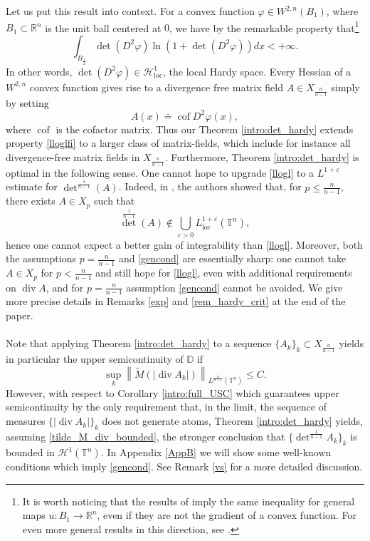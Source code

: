 \documentclass[10pt,reqno]{amsart}
\numberwithin{equation}{section}
\newcommand{\R}{\mathbb{R}}
\newcommand{\T}{\mathbb{T}}
\newcommand{\D}{\mathbb{D}}
\newcommand{\eps}{\varepsilon}
\DeclareMathOperator{\cof}{cof}
\DeclareMathOperator{\dv}{div}
\DeclareMathOperator{\loc}{loc}
\theoremstyle{plain}
\theoremstyle{definition}
\theoremstyle{remark}
\begin{document}
Let us put this result into context. For a convex function $\varphi\in W^{2,n}(B_1)$, where $B_1 \subset \R^n$ is the unit ball centered at $0$, we have by \cite{MULDET,MULDETPOS} the remarkable property that\footnote{It is worth noticing that the results of \cite{MULDET,MULDETPOS} imply the same inequality for general maps $u: B_1 \to \R^n$, even if they are not the gradient of a convex function. For even more general results in this direction, see \cite{DET}.}
\begin{equation}\label{lloglfi}
\int_{B_\frac{1}{2}}\det(D^2\varphi)\ln(1 + \det(D^2\varphi))dx < + \infty.
\end{equation}
In other words, $\det(D^2\varphi) \in \mathcal{H}^1_{\loc}$, the local Hardy space. Every Hessian of a $W^{2,n}$ convex function gives rise to a divergence free matrix field $A \in X_{\frac{n}{n - 1}}$ simply by setting
\[
A(x) \doteq \cof D^2\varphi(x),
\]
where $\cof$ is the cofactor matrix. Thus our Theorem \ref{intro:det_hardy} extends property \eqref{lloglfi} to a larger class of matrix-fields, which include for instance all divergence-free matrix fields in $X_{\frac{n}{n-1}}$. Furthermore, Theorem \ref{intro:det_hardy} is optimal in the following sense. One cannot hope to upgrade \eqref{llogl} to a $L^{1+\eps}$ estimate for ${\det}^\frac{1}{n-1}(A)$. Indeed, in \cite{DRT}, the authors showed that, for $p \le \frac{n}{n-1}$, there exists $A \in X_p$ such that
\[
{\det}^\frac{1}{n - 1}(A) \notin \bigcup_{\eps > 0}L^{1 + \eps}_{\loc}(\T^n),
\]
hence one cannot expect a better gain of integrability than \eqref{llogl}. 
Moreover, both the assumptions $p=\frac{n}{n-1}$ and \eqref{gencond} are essentially sharp: one cannot take $A \in X_p$ for $p < \frac{n}{n-1}$ and still hope for \eqref{llogl}, even with additional requirements on $\dv A$, and  for $p=\frac{n}{n-1}$ assumption \eqref{gencond} cannot be avoided. We give more precise details in Remarks \ref{exp} and \ref{rem_hardy_crit} at the end of the paper.
\\
\\
Note that  applying Theorem \ref{intro:det_hardy} to a sequence $\{A_k\}_k\subset X_\frac{n}{n-1}$ yields in particular the upper semicontinuity of $\D$ if  
\begin{equation}\label{tilde_M_div_bounded}
\sup_k \left\|\tilde M (|\dv A_k|)\right\|_{L^\frac{n}{n - 1}(\T^n)} \le C.
\end{equation}
However, with respect to Corollary \ref{intro:full_USC} which guarantees upper semicontinuity by the only requirement that, in the limit, the sequence of measures $\{| \dv A_k|\}_k$ does not generate atoms, Theorem \ref{intro:det_hardy} yields, assuming \eqref{tilde_M_div_bounded}, the stronger conclusion that $\{ \det^\frac{1}{n-1} A_k\}_k$ is bounded in $\mathcal{H}^1(\T^n)$. In Appendix \ref{AppB} we will show some well-known conditions which imply \eqref{gencond}. See Remark \ref{vs} for a more detailed discussion.
\end{document}
